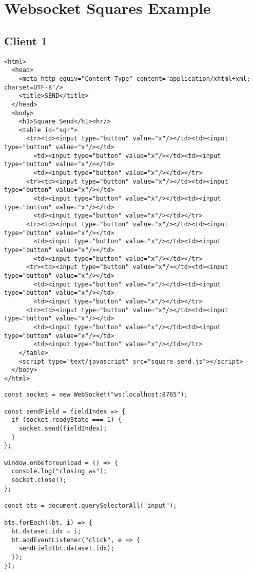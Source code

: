 \documentclass[11pt]{article}
\begin{document}
\section{Websocket Squares Example}
\label{sec:org46bf875}
\subsection{Client 1}
\label{sec:orga2a31d3}
\lstset{breaklines=true,language=HTML,label= ,caption= ,captionpos=b,numbers=none}
\begin{lstlisting}
<html>
  <head>
    <meta http-equiv="Content-Type" content="application/xhtml+xml; charset=UTF-8"/>
    <title>SEND</title>
  </head>
  <body>
    <h1>Square Send</h1><hr/>
    <table id="sqr">
      <tr><td><input type="button" value="x"/></td><td><input type="button" value="x"/></td>
        <td><input type="button" value="x"/></td><td><input type="button" value="x"/></td>
        <td><input type="button" value="x"/></td></tr>
      <tr><td><input type="button" value="x"/></td><td><input type="button" value="x"/></td>
        <td><input type="button" value="x"/></td><td><input type="button" value="x"/></td>
        <td><input type="button" value="x"/></td></tr>
      <tr><td><input type="button" value="x"/></td><td><input type="button" value="x"/></td>
        <td><input type="button" value="x"/></td><td><input type="button" value="x"/></td>
        <td><input type="button" value="x"/></td></tr>
      <tr><td><input type="button" value="x"/></td><td><input type="button" value="x"/></td>
        <td><input type="button" value="x"/></td><td><input type="button" value="x"/></td>
        <td><input type="button" value="x"/></td></tr>
      <tr><td><input type="button" value="x"/></td><td><input type="button" value="x"/></td>
        <td><input type="button" value="x"/></td><td><input type="button" value="x"/></td>
        <td><input type="button" value="x"/></td></tr>
    </table>
    <script type="text/javascript" src="square_send.js"></script>
  </body>
</html>
\end{lstlisting}
\lstset{breaklines=true,language=javascript,label= ,caption= ,captionpos=b,numbers=none}
\begin{lstlisting}
const socket = new WebSocket("ws:localhost:8765");

const sendField = fieldIndex => {
  if (socket.readyState === 1) {
    socket.send(fieldIndex);
  }
};

window.onbeforeunload = () => {
  console.log("closing ws");
  socket.close();
};

const bts = document.querySelectorAll("input");

bts.forEach((bt, i) => {
  bt.dataset.idx = i;
  bt.addEventListener("click", e => {
    sendField(bt.dataset.idx);
  });
});

\end{lstlisting}
\end{document}
